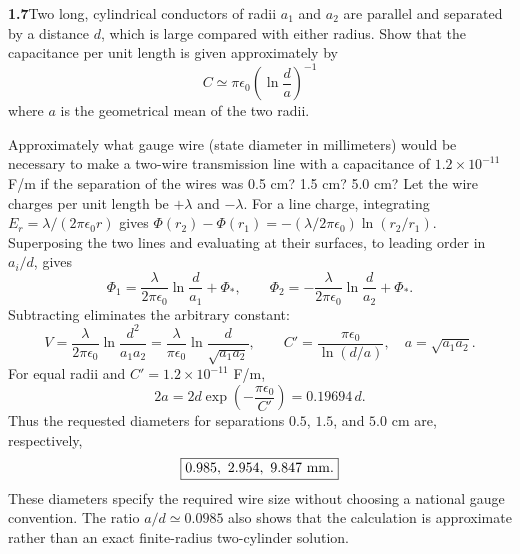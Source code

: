 \par\bigskip
\noindent\textbf{1.7}\quad Two long, cylindrical conductors of radii $a_{1}$ and $a_{2}$ are parallel and separated by a distance $d$, which is large compared with either radius. Show that the capacitance per unit length is given approximately by
\[
C \simeq \pi\epsilon_{0}\left(\ln\frac{d}{a}\right)^{-1}
\]
where $a$ is the geometrical mean of the two radii.

Approximately what gauge wire (state diameter in millimeters) would be necessary to make a two-wire transmission line with a capacitance of $1.2\times10^{-11}$ F/m if the separation of the wires was 0.5 cm? 1.5 cm? 5.0 cm?
\solution
Let the wire charges per unit length be $+\lambda$ and $-\lambda$.
For a line charge, integrating $E_r=\lambda/(2\pi\epsilon_0r)$ gives
$\Phi(r_2)-\Phi(r_1)=-(\lambda/2\pi\epsilon_0)\ln(r_2/r_1)$.
Superposing the two lines and evaluating at their surfaces, to leading order
in $a_i/d$, gives
\[
\Phi_1=\frac{\lambda}{2\pi\epsilon_0}\ln\frac d{a_1}+\Phi_*,\qquad
\Phi_2=-\frac{\lambda}{2\pi\epsilon_0}\ln\frac d{a_2}+\Phi_*.
\]
Subtracting eliminates the arbitrary constant:
\[
V=\frac{\lambda}{2\pi\epsilon_0}\ln\frac{d^2}{a_1a_2}
=\frac{\lambda}{\pi\epsilon_0}\ln\frac d{\sqrt{a_1a_2}},\qquad
\boxed{C'=\frac{\pi\epsilon_0}{\ln(d/a)},\quad a=\sqrt{a_1a_2}.}
\]
For equal radii and $C'=1.2\times10^{-11}$ F/m,
\[
2a=2d\exp\left(-\frac{\pi\epsilon_0}{C'}\right)=0.19694\,d.
\]
Thus the requested diameters for separations $0.5$, $1.5$, and $5.0$ cm are,
respectively,
\[\boxed{0.985,\ 2.954,\ 9.847\ {\rm mm}.}\]
These diameters specify the required wire size without choosing a national
gauge convention. The ratio $a/d\simeq0.0985$ also shows that the calculation
is approximate rather than an exact finite-radius two-cylinder solution.


